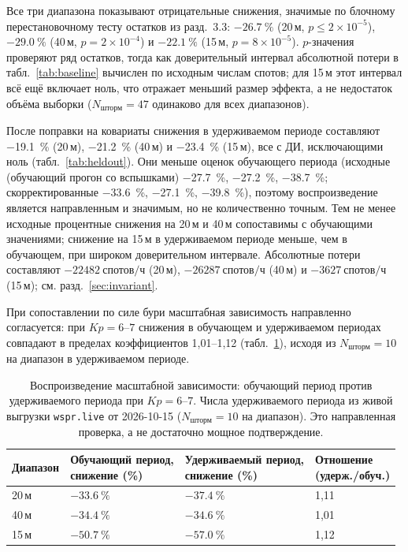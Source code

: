 \documentclass{agujournal2019}
\begin{document}
Все три диапазона показывают отрицательные снижения, значимые по блочному
перестановочному тесту остатков из разд.~3.3: $\SI{-26.7}{\percent}$
(20\,м, $p \le 2 \times 10^{-5}$), $\SI{-29.0}{\percent}$ (40\,м,
$p = 2 \times 10^{-4}$) и $\SI{-22.1}{\percent}$ (15\,м,
$p = 8 \times 10^{-5}$). $p$-значения проверяют ряд остатков, тогда как
доверительный интервал абсолютной потери в табл.~\ref{tab:baseline}
вычислен по исходным числам спотов; для 15\,м этот интервал всё ещё включает
ноль, что отражает меньший размер эффекта, а не недостаток объёма выборки
($N_{\mbox{шторм}} = 47$ одинаково для всех диапазонов).

После поправки на ковариаты снижения в удерживаемом периоде составляют
\SI{-19.1}{\percent} (20\,м), \SI{-21.2}{\percent} (40\,м) и
\SI{-23.4}{\percent} (15\,м), все с ДИ, исключающими ноль
(табл.~\ref{tab:heldout}). Они меньше оценок обучающего периода
(исходные (обучающий прогон со вспышками)
\SI{-27.7}{\percent}, \SI{-27.2}{\percent}, \SI{-38.7}{\percent};
скорректированные \SI{-33.6}{\percent}, \SI{-27.1}{\percent},
\SI{-39.8}{\percent}), поэтому воспроизведение является направленным
и значимым, но не количественно точным. Тем не менее исходные процентные
снижения на 20\,м и 40\,м сопоставимы с обучающими значениями; снижение на 15\,м в удерживаемом периоде меньше, чем в обучающем, при широком
доверительном интервале. Абсолютные потери составляют
$\SI{-22482}{\mbox{спотов/ч}}$ (20\,м), $\SI{-26287}{\mbox{спотов/ч}}$ (40\,м) и
$\SI{-3627}{\mbox{спотов/ч}}$ (15\,м); см. разд.~\ref{sec:invariant}.

При сопоставлении по силе бури масштабная зависимость направленно
согласуется: при $Kp = 6\text{--}7$ снижения в обучающем и удерживаемом периодах
совпадают в пределах коэффициентов 1,01--1,12 (табл.~\ref{tab:scale_rep}),
исходя из $N_{\mbox{шторм}} = 10$ на диапазон в удерживаемом периоде.

\begin{table}[h]
	\centering
	\footnotesize
	\setlength{\tabcolsep}{3pt}
	\caption{Воспроизведение масштабной зависимости: обучающий период
		против удерживаемого периода при $Kp = 6\text{--}7$. Числа удерживаемого периода
		из живой выгрузки \texttt{wspr.live} от 2026-10-15
		($N_{\mbox{шторм}} = 10$ на диапазон). Это направленная проверка,
		а не достаточно мощное подтверждение.}
	\label{tab:scale_rep}
	\begin{tabular}{llll}
		\toprule
		Диапазон
		& \shortstack[b]{Обучающий период,\\ снижение (\%)}
		& \shortstack[b]{Удерживаемый период,\\ снижение (\%)}
		& \shortstack[b]{Отношение\\(удерж./обуч.)} \\
		\midrule
		20\,м & $\SI{-33.6}{\percent}$ & $\SI{-37.4}{\percent}$ & 1,11        \\
		40\,м & $\SI{-34.4}{\percent}$ & $\SI{-34.6}{\percent}$ & 1,01        \\
		15\,м & $\SI{-50.7}{\percent}$ & $\SI{-57.0}{\percent}$ & 1,12        \\
		\bottomrule
	\end{tabular}
\end{table}
\end{document}

